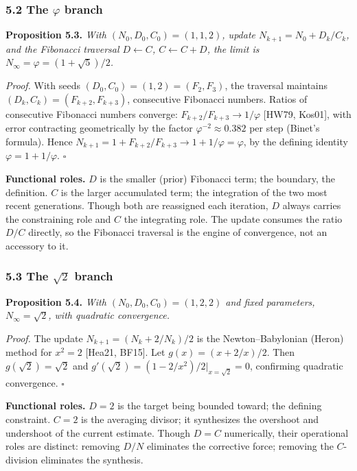 \documentclass[12pt]{article}
\begin{document}
\subsubsection{\texorpdfstring{5.2 The \(\varphi\)
branch}{5.2 The \textbackslash varphi branch}}\label{the-varphi-branch}

\textbf{Proposition 5.3.} \emph{With \((N_0, D_0, C_0) = (1, 1, 2)\),
update \(N_{k+1} = N_0 + D_k/C_k\), and the Fibonacci traversal
\(D \leftarrow C\), \(C \leftarrow C + D\), the limit is
\(N_\infty = \varphi = (1+\sqrt{5})/2\).}

\emph{Proof.} With seeds \((D_0, C_0) = (1, 2) = (F_2, F_3)\), the
traversal maintains \((D_k, C_k) = (F_{k+2}, F_{k+3})\), consecutive
Fibonacci numbers. Ratios of consecutive Fibonacci numbers converge:
\(F_{k+2}/F_{k+3} \to 1/\varphi\) {[}HW79, Kos01{]}, with error
contracting geometrically by the factor \(\varphi^{-2} \approx 0.382\)
per step (Binet's formula). Hence
\(N_{k+1} = 1 + F_{k+2}/F_{k+3} \to 1 + 1/\varphi = \varphi\), by the
defining identity \(\varphi = 1 + 1/\varphi\). \(\square\)

\textbf{Functional roles.} \(D\) is the smaller (prior) Fibonacci term;
the boundary, the definition. \(C\) is the larger accumulated term; the
integration of the two most recent generations. Though both are
reassigned each iteration, \(D\) always carries the constraining role
and \(C\) the integrating role. The update consumes the ratio \(D/C\)
directly, so the Fibonacci traversal is the engine of convergence, not
an accessory to it.

\subsubsection{\texorpdfstring{5.3 The \(\sqrt{2}\)
branch}{5.3 The \textbackslash sqrt\{2\} branch}}\label{the-sqrt2-branch}

\textbf{Proposition 5.4.} \emph{With \((N_0, D_0, C_0) = (1, 2, 2)\) and
fixed parameters, \(N_\infty = \sqrt{2}\), with quadratic convergence.}

\emph{Proof.} The update \(N_{k+1} = (N_k + 2/N_k)/2\) is the
Newton--Babylonian (Heron) method for \(x^2 = 2\) {[}Hea21, BF15{]}. Let
\(g(x) = (x + 2/x)/2\). Then \(g(\sqrt{2}) = \sqrt{2}\) and
\(g'(\sqrt{2}) = (1 - 2/x^2)/2\big|_{x=\sqrt{2}} = 0\), confirming
quadratic convergence. \(\square\)

\textbf{Functional roles.} \(D = 2\) is the target being bounded toward;
the defining constraint. \(C = 2\) is the averaging divisor; it
synthesizes the overshoot and undershoot of the current estimate. Though
\(D = C\) numerically, their operational roles are distinct: removing
\(D/N\) eliminates the corrective force; removing the \(C\)-division
eliminates the synthesis.
\end{document}
